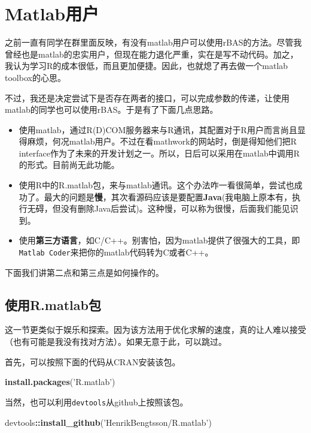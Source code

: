 \documentclass[]{ctexbook}
\newenvironment{Shaded}{\begin{snugshade}}{\end{snugshade}}
\newcommand{\KeywordTok}[1]{\textcolor[rgb]{0.13,0.29,0.53}{\textbf{#1}}}
\newcommand{\StringTok}[1]{\textcolor[rgb]{0.31,0.60,0.02}{#1}}
\newcommand{\OperatorTok}[1]{\textcolor[rgb]{0.81,0.36,0.00}{\textbf{#1}}}
\newcommand{\NormalTok}[1]{#1}
\providecommand{\tightlist}{%
  \setlength{\itemsep}{0pt}\setlength{\parskip}{0pt}}
\theoremstyle{definition}
\theoremstyle{definition}
\theoremstyle{definition}
\theoremstyle{remark}
\begin{document}
\chapter{Matlab用户}\label{matlabr}

之前一直有同学在群里面反映，有没有matlab用户可以使用rBAS的方法。尽管我曾经也是matlab的忠实用户，但现在能力退化严重，实在是写不动代码。加之，我认为学习R的成本很低，而且更加便捷。因此，也就熄了再去做一个matlab
toolbox的心思。

不过，我还是决定尝试下是否存在两者的接口，可以完成参数的传递，让使用matlab的同学也可以使用rBAS。于是有了下面几点思路。

\begin{itemize}
\tightlist
\item
  使用matlab，通过R(D)COM服务器来与R通讯，其配置对于R用户而言尚且显得麻烦，何况matlab用户。不过在看mathwork的网站时，倒是得知他们把R
  interface作为了未来的开发计划之一。所以，日后可以采用在matlab中调用R的形式。目前尚无此功能。
\item
  使用R中的R.matlab包，来与matlab通讯。这个办法咋一看很简单，尝试也成功了。最大的问题是\textbf{慢}，其次看源码应该是要配置\textbf{Java}(我电脑上原本有，执行无碍，但没有删除Java后尝试)。这种慢，可以称为很慢，后面我们能见识到。
\item
  使用\textbf{第三方语言}，如C/C++。别害怕，因为matlab提供了很强大的工具，即\texttt{Matlab\ Coder}来把你的matlab代码转为C或者C++。
\end{itemize}

下面我们讲第二点和第三点是如何操作的。

\section{使用R.matlab包}\label{r.matlab}

这一节更类似于娱乐和探索。因为该方法用于优化求解的速度，真的让人难以接受（也有可能是我没有找对方法）。如果无意于此，可以跳过。

首先，可以按照下面的代码从CRAN安装该包。

\begin{Shaded}
\begin{Highlighting}[]
\KeywordTok{install.packages}\NormalTok{(}\StringTok{'R.matlab'}\NormalTok{)}
\end{Highlighting}
\end{Shaded}

当然，也可以利用\texttt{devtools}从github上按照该包。

\begin{Shaded}
\begin{Highlighting}[]
\NormalTok{devtools}\OperatorTok{::}\KeywordTok{install_github}\NormalTok{(}\StringTok{'HenrikBengtsson/R.matlab'}\NormalTok{)}
\end{Highlighting}
\end{Shaded}
\end{document}
